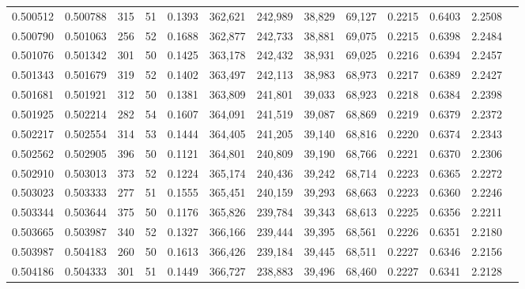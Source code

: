 \begin{tabular}{rrrrrrrrrrrrr}
0.500512 & 0.500788 &   315 &  51 &                                     0.1393 & 362,621 & 242,989 &  38,829 &  69,127 & 0.2215 & 0.6403 & 2.2508 \\
0.500790 & 0.501063 &   256 &  52 &                                     0.1688 & 362,877 & 242,733 &  38,881 &  69,075 & 0.2215 & 0.6398 & 2.2484 \\
0.501076 & 0.501342 &   301 &  50 &                                     0.1425 & 363,178 & 242,432 &  38,931 &  69,025 & 0.2216 & 0.6394 & 2.2457 \\
0.501343 & 0.501679 &   319 &  52 &                                     0.1402 & 363,497 & 242,113 &  38,983 &  68,973 & 0.2217 & 0.6389 & 2.2427 \\
0.501681 & 0.501921 &   312 &  50 &                                     0.1381 & 363,809 & 241,801 &  39,033 &  68,923 & 0.2218 & 0.6384 & 2.2398 \\
0.501925 & 0.502214 &   282 &  54 &                                     0.1607 & 364,091 & 241,519 &  39,087 &  68,869 & 0.2219 & 0.6379 & 2.2372 \\
0.502217 & 0.502554 &   314 &  53 &                                     0.1444 & 364,405 & 241,205 &  39,140 &  68,816 & 0.2220 & 0.6374 & 2.2343 \\
0.502562 & 0.502905 &   396 &  50 &                                     0.1121 & 364,801 & 240,809 &  39,190 &  68,766 & 0.2221 & 0.6370 & 2.2306 \\
0.502910 & 0.503013 &   373 &  52 &                                     0.1224 & 365,174 & 240,436 &  39,242 &  68,714 & 0.2223 & 0.6365 & 2.2272 \\
0.503023 & 0.503333 &   277 &  51 &                                     0.1555 & 365,451 & 240,159 &  39,293 &  68,663 & 0.2223 & 0.6360 & 2.2246 \\
0.503344 & 0.503644 &   375 &  50 &                                     0.1176 & 365,826 & 239,784 &  39,343 &  68,613 & 0.2225 & 0.6356 & 2.2211 \\
0.503665 & 0.503987 &   340 &  52 &                                     0.1327 & 366,166 & 239,444 &  39,395 &  68,561 & 0.2226 & 0.6351 & 2.2180 \\
0.503987 & 0.504183 &   260 &  50 &                                     0.1613 & 366,426 & 239,184 &  39,445 &  68,511 & 0.2227 & 0.6346 & 2.2156 \\
0.504186 & 0.504333 &   301 &  51 &                                     0.1449 & 366,727 & 238,883 &  39,496 &  68,460 & 0.2227 & 0.6341 & 2.2128 \\

\end{tabular}
